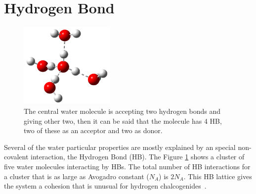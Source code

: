 
\newpage

\section{Hydrogen Bond}

\begin{figure} %
    \centering
    \includegraphics[width=0.41\textwidth]{2/img/4h2o}
    \caption{The central water molecule is accepting two hydrogen
    bonds and giving other two,
    then it can be said that the molecule has 4 HB, two of these
    as an acceptor and two as donor.}
    \label{4_h2o}
\end{figure}

Several of the water particular properties are mostly explained by an special
non-covalent interaction, the Hydrogen Bond (HB). The Figure \ref{4_h2o} shows
a cluster of five water molecules interacting by HBs. The total number of HB
interactions for a cluster that is as large as Avogadro constant ($N_A$) is
$2N_A$. This HB lattice gives the system a cohesion that is unusual for
hydrogen chalcogenides~\cite{smith2005}.

